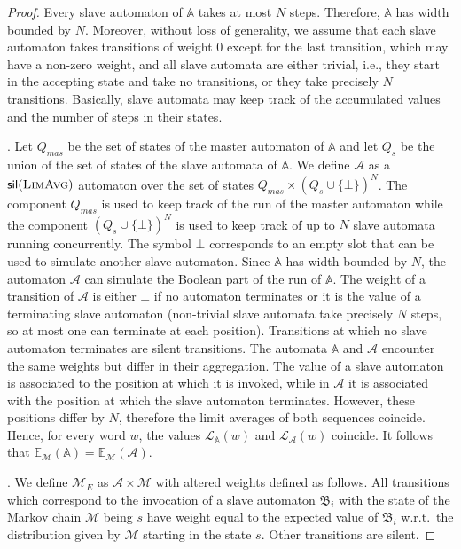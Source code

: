 \documentclass{lmcs}
\newcommand{\Paragraph}[1]{\noindent{\textbf{#1}}}
\newcommand{\nestedA}{\mathbb{A}}
\newcommand{\slaveA}{{\mathfrak{B}}}
\newcommand{\nonnestedA}{\mathcal{A}}
\newcommand{\silent}[1]{\mathsf{sil}({#1})}
\newcommand{\valueL}[1]{\mathcal{L}_{{#1}}}
\newcommand{\flimavg}{\textsc{LimAvg}}
\newcommand{\expected}{\mathbb{E}}
\newcommand{\markov}{\mathcal{M}}
\begin{document}
\begin{proof}
Every slave automaton of $\nestedA$ takes at most $N$ steps. Therefore,
$\nestedA$ has width bounded by $N$.
Moreover, without loss of generality, we assume that each slave automaton
takes transitions of weight $0$ except for the last transition, which may have a non-zero weight,
and all slave automata are either trivial, i.e., they start in the accepting state and take no transitions,
or they take precisely $N$ transitions.
Basically, slave automata may keep track of the accumulated values
and the number of steps in their states.

\Paragraph{The automaton $\nonnestedA$}. Let
$Q_{mas}$ be the set of states of the master automaton of $\nestedA$ and let
$Q_s$ be the union of the set of states of the slave automata of $\nestedA$.
We define $\nonnestedA$ as a $\silent{\flimavg}$ automaton over the set of states $Q_{mas} \times {(Q_s \cup \{\bot\})}^N$.
The component $Q_{mas}$ is used to keep track of the run of the master automaton while
the component  ${(Q_s \cup \{\bot\})}^N$ is used to keep track of up to $N$ slave automata running concurrently.
The symbol $\bot$ corresponds to an empty slot that can be used to simulate another slave automaton.
Since $\nestedA$ has width bounded by $N$, the automaton $\nonnestedA$ can simulate the Boolean part of the run of $\nestedA$.
The weight of a transition of $\nonnestedA$ is either $\bot$ if no automaton terminates or it is
the value of a terminating slave automaton (non-trivial slave automata take precisely $N$ steps, so at most one can terminate at each position).
Transitions at which no slave automaton terminates are silent transitions.
The automata $\nestedA$ and $\nonnestedA$ encounter the same weights but differ in their aggregation.
The value of a slave automaton is associated to the position at which it is invoked, while in $\nonnestedA$ it is associated with
the position at which the slave automaton terminates.
However, these positions differ by $N$, therefore
the limit averages of both sequences coincide.
Hence, for every word $w$, the values $\valueL{\nestedA}(w)$ and $\valueL{\nonnestedA}(w)$ coincide.
It follows that $\expected_{\markov}(\nestedA) = \expected_{\markov}(\nonnestedA)$.

\Paragraph{The Markov chain $\markov_E$}. We define $\markov_E$ as $\nonnestedA \times \markov$ with altered weights defined as follows.
All transitions which correspond to the invocation of a slave automaton $\slaveA_i$ with the state of the Markov chain $\markov$ being $s$
have weight equal to the expected value of $\slaveA_i$ w.r.t.\ the distribution given by $\markov$ starting in the state $s$.
Other transitions are silent.


\end{proof}
\end{document}
